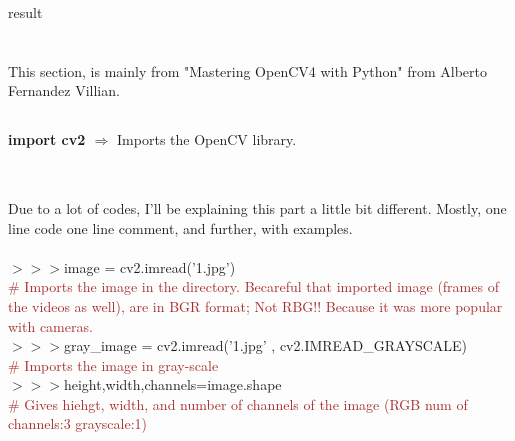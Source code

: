 \documentclass[a4paper,18pt]{article}
\begin{document}
\hspace{14pt} result\\


\newpage

\section{\colorbox {Abi}{}}
This section, is mainly from "Mastering OpenCV4 with Python" from Alberto Fernandez Villian.
\subsection{\colorbox {matgreen}{\color{white}{\large import cv2}}}
\textbf{import cv2 $\Rightarrow$} Imports the OpenCV library.\\\\


\subsection{\colorbox {matgreen}{\color{white}{\large Primary Works on Image}}}
Due to a lot of codes, I'll be explaining this part a little bit different. Mostly, one line code one line comment, and further, with examples.\\\\


$>>>$image = cv2.imread('1.jpg')\\{\textcolor{brown}{\# Imports the image in the directory. Becareful that imported image (frames of the videos as well), are in BGR format; Not RBG!! Because it was more popular with cameras.}}\\

$>>>$gray\_image = cv2.imread('1.jpg' , cv2.IMREAD\_GRAYSCALE)\\{\textcolor{brown}{\# Imports the image in gray-scale}}\\

$>>>$height,width,channels=image.shape\\{\textcolor{brown}{\# Gives hiehgt, width, and number of channels of the image (RGB num of channels:3 grayscale:1)}}\\
\end{document}
